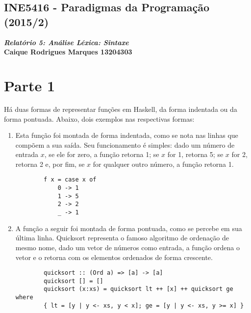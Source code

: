 \documentclass{article}
\begin{document}
\lstset{language=Haskell} %
\begin{center}
    \section*{INE5416 - Paradigmas da Programação (2015/2)}
    \textbf{\textit{Relatório 5: Análise Léxica: Sintaxe} \\
    Caique Rodrigues Marques 13204303}
\end{center}

\section*{Parte 1}
    Há duas formas de representar funções em Haskell, da forma indentada ou da forma pontuada. Abaixo, dois exemplos nas respectivas formas: 
    \begin{enumerate}
        \item Esta função foi montada de forma indentada, como se nota nas linhas que compõem a sua saída. Seu funcionamento é simples: dado um número de entrada $x$, se ele for zero, a função retorna 1; se $x$ for 1, retorna 5; se $x$ for 2, retorna 2 e, por fim, se $x$ for qualquer outro número, a função retorna 1.
        \begin{lstlisting}
        f x = case x of
            0 -> 1
            1 -> 5
            2 -> 2
            _ -> 1
        \end{lstlisting}
        
        \item A função a seguir foi montada de forma pontuada, como se percebe em sua última linha. Quicksort representa o famoso algoritmo de ordenação de mesmo nome, dado um vetor de números como entrada, a função ordena o vetor e o retorna com os elementos ordenados de forma crescente. 
        \begin{lstlisting}
        quicksort :: (Ord a) => [a] -> [a]
        quicksort [] = []
        quicksort (x:xs) = quicksort lt ++ [x] ++ quicksort ge where 
        { lt = [y | y <- xs, y < x]; ge = [y | y <- xs, y >= x] }
        \end{lstlisting}
    \end{enumerate}
    
\end{document}
